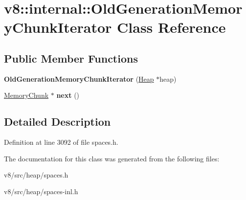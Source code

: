 \hypertarget{classv8_1_1internal_1_1OldGenerationMemoryChunkIterator}{}\section{v8\+:\+:internal\+:\+:Old\+Generation\+Memory\+Chunk\+Iterator Class Reference}
\label{classv8_1_1internal_1_1OldGenerationMemoryChunkIterator}
\subsection*{Public Member Functions}
\begin{DoxyCompactItemize}
\item 
\mbox{\label{classv8_1_1internal_1_1OldGenerationMemoryChunkIterator_a6e3a801d65caae0012ae7664f90a1b79}} 
{\bfseries Old\+Generation\+Memory\+Chunk\+Iterator} (\mbox{\hyperlink{classv8_1_1internal_1_1Heap}{Heap}} $\ast$heap)
\item 
\mbox{\label{classv8_1_1internal_1_1OldGenerationMemoryChunkIterator_aeddd890fc4a7dbecf7f65eaf1fb3324c}} 
\mbox{\hyperlink{classv8_1_1internal_1_1MemoryChunk}{Memory\+Chunk}} $\ast$ {\bfseries next} ()
\end{DoxyCompactItemize}


\subsection{Detailed Description}


Definition at line 3092 of file spaces.\+h.



The documentation for this class was generated from the following files\+:\begin{DoxyCompactItemize}
\item 
v8/src/heap/spaces.\+h\item 
v8/src/heap/spaces-\/inl.\+h\end{DoxyCompactItemize}
